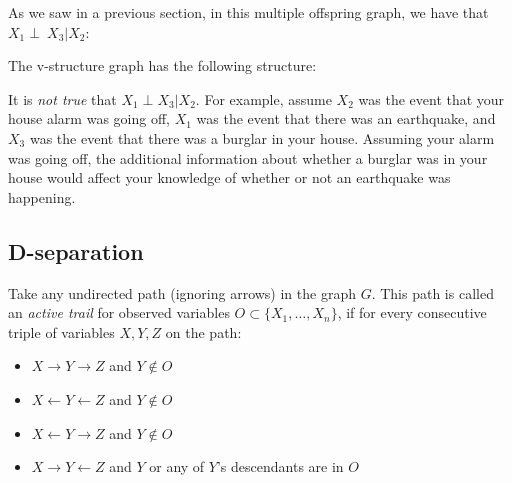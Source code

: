 \documentclass[12pt]{report}
\begin{document}
As we saw in a previous section, in this multiple offspring graph, we
have that $X_1 \perp~ X_3 | X_2$:

\begin{center}
\end{center}

The v-structure graph has the following structure:
\begin{center}
\end{center}
It is \emph{not true} that $X_1 \perp X_3 | X_2$. For example, assume
$X_2$ was the event that your house alarm was going off, $X_1$ was the
event that there was an earthquake, and $X_3$ was the event that there
was a burglar in your house. Assuming your alarm was going off, the
additional information about whether a burglar was in your house would
affect your knowledge of whether or not an earthquake was
happening.

\subsection{D-separation}
Take any undirected path (ignoring arrows) in the graph $G$. This path
is called an \emph{active trail} for observed variables $O \subset
\{X_1,\ldots,X_n\}$, if for every consecutive triple of variables
$X,Y,Z$ on the path:
\begin{itemize}
\item $X \rightarrow Y \rightarrow Z$ and $Y\not\in O$
\item $X \leftarrow Y \leftarrow Z$ and $Y\not\in O$
\item $X \leftarrow Y \rightarrow Z$ and $Y\not\in O$
\item $X\rightarrow Y \leftarrow Z$ and $Y$ or any of $Y$'s
  descendants are in $O$
\end{itemize}
\end{document}
